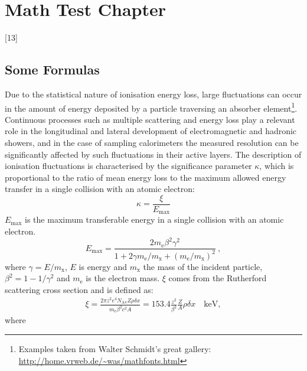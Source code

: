 
\chapter{Math Test Chapter} %

\label{ch:mathtest} %


[13]


\section{Some Formulas}

Due to the statistical nature of ionisation energy loss, large fluctuations can occur in the amount of energy deposited by a particle traversing an absorber element\footnote{Examples taken from Walter Schmidt's great gallery: \\ \url{http://home.vrweb.de/~was/mathfonts.html}}.  Continuous processes such as multiple scattering and energy loss play a relevant role in the longitudinal and lateral development of electromagnetic and hadronic showers, and in the case of sampling calorimeters the measured resolution can be significantly affected by such fluctuations in their active layers.  The description of ionisation fluctuations is characterised by the significance parameter $\kappa$, which is proportional to the ratio of mean energy loss to the maximum allowed energy transfer in a single collision with an atomic electron: 
\begin{equation}
\kappa =\frac{\xi}{E_{\mathrm{max}}} %
\end{equation}
$E_{\mathrm{max}}$ is the maximum transferable energy in a single collision with an atomic electron.
\[E_{\mathrm{max}} =\frac{2 m_{\mathrm{e}} \beta^2\gamma^2 }{1 + 2\gamma m_{\mathrm{e}}/m_{\mathrm{x}} + \left ( m_{\mathrm{e}} /m_{\mathrm{x}}\right)^2}\ ,\]
where $\gamma = E/m_{\mathrm{x}}$, $E$ is energy and $m_{\mathrm{x}}$ the mass of the incident particle, $\beta^2 = 1 - 1/\gamma^2$ and $m_{\mathrm{e}}$ is the electron mass. $\xi$ comes from the Rutherford scattering cross section and is defined as:
\begin{eqnarray*} \xi  = \frac{2\pi z^2 e^4 N_{\mathrm{Av}} Z \rho
\delta x}{m_{\mathrm{e}} \beta^2 c^2 A} =  153.4 \frac{z^2}{\beta^2}
\frac{Z}{A}
\rho \delta x \quad\mathrm{keV},
\end{eqnarray*}
where

